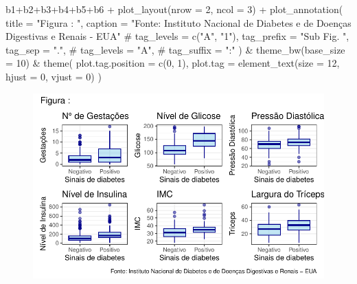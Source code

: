\documentclass[
  letterpaper,
  DIV=11,
  numbers=noendperiod]{scrartcl}
\newenvironment{Shaded}{\begin{snugshade}}{\end{snugshade}}
\newcommand{\AttributeTok}[1]{\textcolor[rgb]{0.40,0.45,0.13}{#1}}
\newcommand{\CommentTok}[1]{\textcolor[rgb]{0.37,0.37,0.37}{#1}}
\newcommand{\DecValTok}[1]{\textcolor[rgb]{0.68,0.00,0.00}{#1}}
\newcommand{\FunctionTok}[1]{\textcolor[rgb]{0.28,0.35,0.67}{#1}}
\newcommand{\NormalTok}[1]{\textcolor[rgb]{0.00,0.23,0.31}{#1}}
\newcommand{\SpecialCharTok}[1]{\textcolor[rgb]{0.37,0.37,0.37}{#1}}
\newcommand{\StringTok}[1]{\textcolor[rgb]{0.13,0.47,0.30}{#1}}
\begin{document}
\begin{Shaded}
\begin{Highlighting}[]
\NormalTok{b1}\SpecialCharTok{+}\NormalTok{b2}\SpecialCharTok{+}\NormalTok{b3}\SpecialCharTok{+}\NormalTok{b4}\SpecialCharTok{+}\NormalTok{b5}\SpecialCharTok{+}\NormalTok{b6 }\SpecialCharTok{+} 
  \FunctionTok{plot\_layout}\NormalTok{(}\AttributeTok{nrow =} \DecValTok{2}\NormalTok{, }\AttributeTok{ncol =} \DecValTok{3}\NormalTok{) }\SpecialCharTok{+} 
  \FunctionTok{plot\_annotation}\NormalTok{(}
    \AttributeTok{title =} \StringTok{"Figura : "}\NormalTok{,}
    \AttributeTok{caption =} \StringTok{"Fonte: Instituto Nacional de Diabetes e de Doenças Digestivas e Renais {-} EUA"}
    \CommentTok{\# tag\_levels = c("A", "1"), tag\_prefix = "Sub Fig. ", tag\_sep = ".",}
    \CommentTok{\# tag\_levels = "A",}
    \CommentTok{\# tag\_suffix = ":"}
\NormalTok{  ) }\SpecialCharTok{\&} \FunctionTok{theme\_bw}\NormalTok{(}\AttributeTok{base\_size =} \DecValTok{10}\NormalTok{) }\SpecialCharTok{\&}
  \FunctionTok{theme}\NormalTok{(}
    \AttributeTok{plot.tag.position =} \FunctionTok{c}\NormalTok{(}\DecValTok{0}\NormalTok{, }\DecValTok{1}\NormalTok{),}
    \AttributeTok{plot.tag =} \FunctionTok{element\_text}\NormalTok{(}\AttributeTok{size =} \DecValTok{12}\NormalTok{, }\AttributeTok{hjust =} \DecValTok{0}\NormalTok{, }\AttributeTok{vjust =} \DecValTok{0}\NormalTok{)}
\NormalTok{  )}
\end{Highlighting}
\end{Shaded}

\begin{figure}[H]

{\centering \includegraphics{relatorio_lab1_files/figure-pdf/unnamed-chunk-9-1.pdf}

}

\end{figure}
\end{document}
